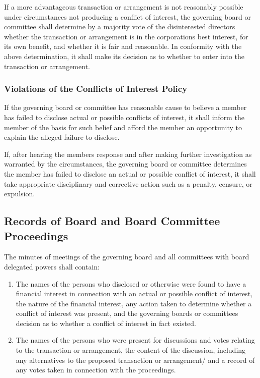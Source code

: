 \documentclass{article}
\begin{document}
		If a more advantageous transaction or arrangement is not reasonably possible under circumstances not producing a conflict of interest, the governing board or committee shall determine by a majority vote of the disinterested directors whether the transaction or arrangement is in the corporation\textquotesingle s best interest, for its own benefit, and whether it is fair and reasonable. In conformity with the above determination, it shall make its decision as to whether to enter into the transaction or arrangement.
		
		\subsubsection{Violations of the Conflicts of Interest Policy}
		If the governing board or committee has reasonable cause to believe a member has failed to disclose actual or possible conflicts of interest, it shall inform the member of the basis for such belief and afford the member an opportunity to explain the alleged failure to disclose.
		
		If, after hearing the member\textquotesingle s response and after making further investigation as warranted by the circumstances, the governing board or committee determines the member has failed to disclose an actual or possible conflict of interest, it shall take appropriate disciplinary and corrective action such as a penalty, censure, or expulsion.
	\subsection{Records of Board and Board Committee Proceedings}
	The minutes of meetings of the governing board and all committees with board delegated powers shall contain:
	\begin{enumerate}[\indent (a)] 
		\item The names of the persons who disclosed or otherwise were found to have a financial interest in connection with an actual or possible conflict of interest, the nature of the financial interest, any action taken to determine whether a conflict of interest was present, and the governing board\textquotesingle s or committee\textquotesingle s decision as to whether a conflict of interest in fact existed.
		\item The names of the persons who were present for discussions and votes relating to the transaction or arrangement, the content of the discussion, including any alternatives to the proposed transaction or arrangement/ and a record of any votes taken in connection with the proceedings.
	\end{enumerate}
	
\end{document}
